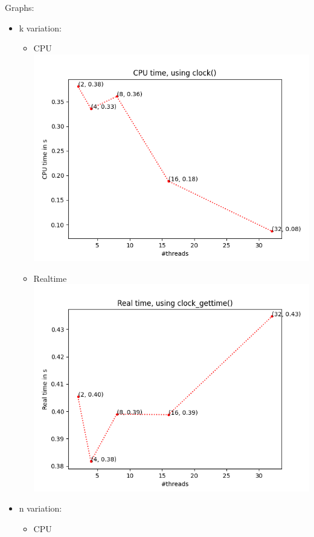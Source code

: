 \documentclass{amsart}           %
\begin{document}
    Graphs:
    \begin{itemize}
        \item k variation: \begin{itemize}
            \item CPU 
            \includegraphics[scale = 0.6]{t_cpu.png}
            \item Realtime
            \includegraphics[scale = 0.6]{t_real.png}
        \end{itemize} \newpage
        \item n variation: \begin{itemize}
            \item CPU 

\end{itemize}
\end{itemize}
\end{document}
